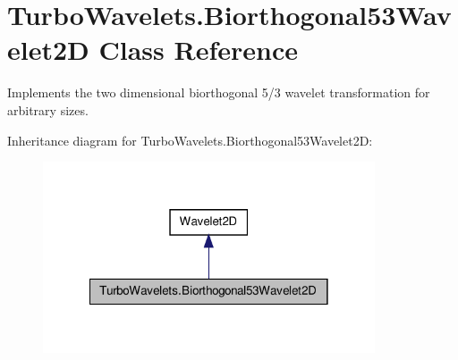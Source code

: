 \hypertarget{class_turbo_wavelets_1_1_biorthogonal53_wavelet2_d}{\section{\-Turbo\-Wavelets.\-Biorthogonal53\-Wavelet2\-D \-Class \-Reference}
\label{class_turbo_wavelets_1_1_biorthogonal53_wavelet2_d}
}


\-Implements the two dimensional biorthogonal 5/3 wavelet transformation for arbitrary sizes.  




\-Inheritance diagram for \-Turbo\-Wavelets.\-Biorthogonal53\-Wavelet2\-D\-:
\nopagebreak
\begin{figure}[H]
\begin{center}
\leavevmode
\includegraphics[width=278pt]{class_turbo_wavelets_1_1_biorthogonal53_wavelet2_d__inherit__graph}
\end{center}
\end{figure}
